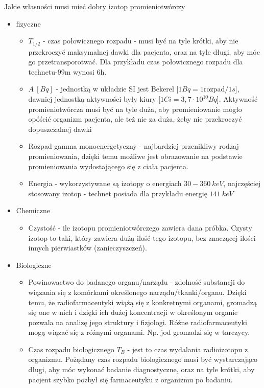 \documentclass{article}
\begin{document}
Jakie własności musi mieć dobry izotop promieniotwórczy
\begin{itemize}
    \item fizyczne \begin{itemize}
        \item $T_{1/2}$ - czas połowicznego rozpadu - musi być na tyle krótki, aby nie przekroczyć maksymalnej dawki dla pacjenta, oraz na tyle długi, aby móc go przetransporotwać. Dla przykładu czas połowicznego rozpadu dla technetu-99m wynosi 6h.
        \item $A~[Bq]$ - jednostką w układzie SI jest Bekerel [$1 Bq = 1\mathrm{rozpad} / 1s$], dawniej jednostką aktywności były kiury [$1 Ci = 3,7 \cdot 10^{10} Bq$]. Aktywność promieniotwórcza musi być na tyle duża, aby promieniowanie mogło opóścić organizm pacjenta, ale też nie za duża, żeby nie przekroczyć dopuszczalnej dawki
        \item Rozpad gamma monoenergetyczny - najbardziej przenikliwy rodzaj promieniowania, dzięki temu możliwe jest obrazowanie na podstawie promieniowania wydostającego się z ciała pacjenta.
        \item Energia - wykorzystywane są izotopy o energiach $30 - 360~keV$, najczęściej stosowany izotop - technet posiada dla przykładu energię $141~keV$
    \end{itemize}
    \item Chemiczne \begin{itemize}
        \item Czystość - ile izotopu promieniotwórczego zawiera dana próbka. Czysty izotop to taki, który zawiera dużą ilość tego izotopu, bez znaczącej ilości innych pierwiastków (zanieczyszczeń). 
    \end{itemize}
    \item Biologiczne \begin{itemize}
        \item Powinowactwo do badanego organu\slash narządu - zdolność substancji do wiązania się z komórkami określonego narządu\slash tkanki\slash organu. Dzięki temu, że radiofarmaceutyki wiążą się z konkretnymi organami, gromadzą się one w nich i dzięki ich dużej koncentracji w określonym organie pozwala na analizę jego struktury i fizjologi. Różne radiofarmaceutyki mogą wiązać się z różnymi organami. Np. jod gromadzi się w tarczycy.
        \item Czas rozpadu biologicznego $T_B$ - jest to czas wydalania radioizotopu z organizmu. Pożądany czas rozpadu biologicznego musi być wystarczająco długi, aby móc wykonać badanie diagnostyczne, oraz na tyle krótki, aby pacjent szybko pozbył się farmaceutyku z organizmu po badaniu.
    \end{itemize}
\end{itemize}
\end{document}
